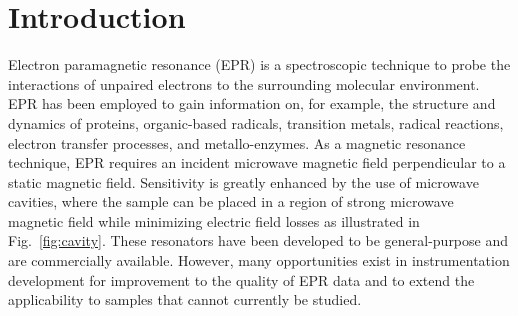 \chapter[Introduction]{Introduction}

Electron paramagnetic resonance (EPR) is a spectroscopic technique to probe the interactions of unpaired electrons to the surrounding molecular environment. EPR has been employed to gain information on, for example, the structure and dynamics of proteins, organic-based radicals, transition metals, radical reactions, electron transfer processes, and metallo-enzymes. As a magnetic resonance technique, EPR requires an incident microwave magnetic field perpendicular to a static magnetic field.\cite{weil2007electron} Sensitivity is greatly enhanced by the use of microwave cavities, where the sample can be placed in a region of strong microwave magnetic field while minimizing electric field losses as illustrated in Fig.~\ref{fig:cavity}. These resonators have been developed to be general-purpose and are commercially available. However, many opportunities exist in instrumentation development for improvement to the quality of EPR data and to extend the applicability to samples that cannot currently be studied. 

